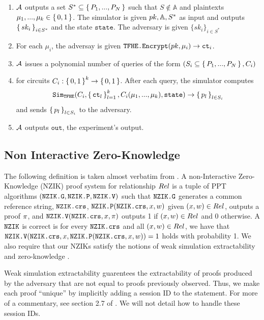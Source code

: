 \begin{definition}
\begin{itemize}
\begin{enumerate}
						\item $\mathcal{A}$ outputs a set $S^* \subseteq \set{P_1, ..., P_N}$ such that $S \notin \mathbb{A}$
						and plaintexts $\mu_1, ..., \mu_k \in \set{0, 1}$. The simulator is given $pk, \mathbb{A}, S^*$ as input
						and outputs $\set{sk_i}_{i \in S^*}$ and the state $\texttt{state}$. The adversary is given $\{sk_i\}_{i \in S^*}$
						\item For each $\mu_i$, the adversay is given $\texttt{TFHE.Encrypt}(pk, \mu_i) \rightarrow \texttt{ct}_i$.
						\item $\mathcal{A}$ issues a polynomial number of queries of the form $(S_i \subseteq \set{P_1, ..., P_N}, C_i)$
						\item for circuits $C_i: \set{0, 1}^k \rightarrow \set{0, 1}$. After each query, the simulator computes
						$$
							\texttt{Sim}_{{\texttt{TFHE}}}(C_i, \set{\texttt{ct}_l}_{l=1}^k, C_i(\mu_1, ..., \mu_k), \texttt{state}) \rightarrow \set{p_l}_{l \in S_i}
						$$
						and sends $\set{p_l}_{l \in S_i}$ to the adversary.
						\item $\mathcal{A}$ outputs $\texttt{out}$, the experiment's output.

		      \end{enumerate}
	\end{itemize}

\end{definition}

\subsection{Non Interactive Zero-Knowledge}
The following definition is taken almost verbatim from \cite{catalano2022adaptively}.
A non-Interactive Zero-Knowledge (NZIK) proof system for relationship $Rel$
is a tuple of PPT algorithms $(\texttt{NZIK.G}, \texttt{NZIK.P}, \texttt{NZIK.V})$ such that $\texttt{NZIK.G}$ generates a common reference string, $\texttt{NZIK.crs}$,
$\texttt{NZIK.P}(\texttt{NZIK.crs}, x, w)$ given $(x, w) \in Rel$, outputs a proof $\pi$,
and $\texttt{NZIK.V}(\texttt{NZIK.crs}, x, \pi)$ outputs 1 if $(x, w) \in Rel$ and 0 otherwise.
A $\texttt{NZIK}$ is correct is for every $\texttt{NZIK.crs}$ and all $(x, w) \in Rel$, we have that\\
$\texttt{NZIK.V}(\texttt{NZIK.crs}, x, \texttt{NZIK.P}(\texttt{NZIK.crs}, x, w)) = 1$ holds with probability 1.
We also require that our NZIKs satisfy the notions of weak simulation extractability \cite{sahai1999non} and 
zero-knowledge \cite{feige1990multiple}.

Weak simulation extractability guarentees the extractability of proofs produced
by the adversary that are not equal to proofs previously observed. Thus, we make each
proof ``unique'' by implicitly adding a session ID to the statement. For more of a commentary,
see section 2.7 of \cite{catalano2022adaptively}. We will not detail how to handle these session IDs.

